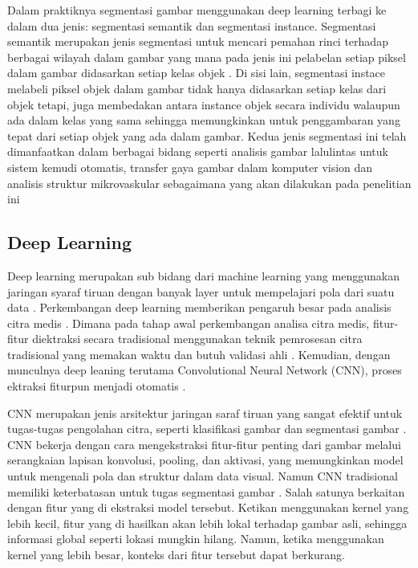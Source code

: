 \noindent Dalam praktiknya segmentasi gambar menggunakan deep learning terbagi ke dalam dua jenis: segmentasi semantik dan segmentasi instance. Segmentasi semantik merupakan jenis segmentasi untuk mencari pemahan rinci terhadap berbagai wilayah dalam gambar yang mana pada jenis ini pelabelan setiap piksel dalam gambar didasarkan setiap kelas objek \cite{fan_image_2023}. Di sisi lain, segmentasi instace melabeli piksel objek dalam gambar tidak hanya didasarkan setiap kelas dari objek tetapi, juga membedakan antara instance objek  secara individu walaupun ada dalam kelas yang sama sehingga memungkinkan untuk penggambaran yang tepat dari setiap objek yang ada dalam gambar. Kedua jenis segmentasi ini telah dimanfaatkan dalam berbagai bidang seperti analisis gambar lalulintas untuk sistem kemudi otomatis, transfer gaya gambar dalam komputer vision dan analisis struktur mikrovaskular sebagaimana yang akan dilakukan pada penelitian ini \cite{wang_traffic_2023, zhang_image_2023, sultan_microvasculature_2023}


\subsection{Deep Learning}

\noindent Deep learning merupakan sub bidang dari machine learning yang menggunakan jaringan syaraf tiruan dengan banyak layer untuk mempelajari pola dari suatu data \cite{goodfellow_deep_2016,yang_deep_2023}. Perkembangan deep learning memberikan pengaruh besar pada analisis citra medis \cite{sistaninejhad_review_2023}. Dimana pada tahap awal perkembangan analisa citra medis, fitur-fitur diektraksi secara tradisional menggunakan teknik pemrosesan citra tradisional yang memakan waktu dan butuh validasi ahli \cite{huang_fully_2022}.  Kemudian, dengan munculnya deep leaning terutama Convolutional Neural Network (CNN), proses ektraksi fiturpun menjadi otomatis \cite{huang_fully_2022,azad_medical_2022}. 

\noindent CNN merupakan jenis arsitektur jaringan saraf tiruan yang sangat efektif untuk tugas-tugas pengolahan citra, seperti klasifikasi gambar dan segmentasi gambar \cite{celeghin_convolutional_2023}. CNN bekerja dengan cara mengekstraksi fitur-fitur penting dari gambar melalui serangkaian lapisan konvolusi, pooling, dan aktivasi, yang memungkinkan model untuk mengenali pola dan struktur dalam data visual. Namun CNN tradisional memiliki keterbatasan untuk tugas segmentasi  gambar \cite{huang_fully_2022, azad_medical_2022, jasim_towards_2023}. Salah satunya berkaitan dengan fitur yang di ekstraksi model tersebut. Ketikan menggunakan kernel yang lebih kecil, fitur yang di hasilkan akan lebih lokal terhadap gambar asli, sehingga informasi global seperti lokasi mungkin hilang. Namun, ketika menggunakan kernel yang lebih besar, konteks dari fitur tersebut dapat berkurang.


